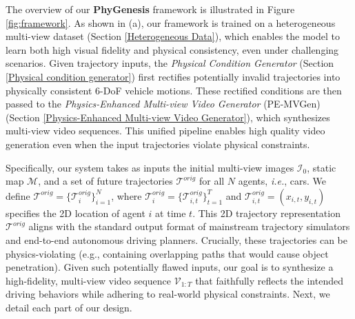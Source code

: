 \documentclass[runningheads]{llncs}
\begin{document}
The overview of our \textbf{PhyGenesis} framework is illustrated in Figure \ref{fig:framework}. As shown in (a), our framework is trained on a heterogeneous multi-view dataset (Section \ref{Heterogeneous Data}), which enables the model to learn both high visual fidelity and physical consistency, even under challenging scenarios.
Given trajectory inputs, the \textit{Physical Condition Generator} (Section \ref{Physical condition generator}) first rectifies potentially invalid trajectories into physically consistent 6-DoF vehicle motions.
These rectified conditions are then passed to the \textit{Physics-Enhanced Multi-view Video Generator} (PE-MVGen) (Section \ref{Physics-Enhanced Multi-view Video Generator}), which synthesizes  multi-view video sequences.
This unified pipeline enables high quality video generation even when the input trajectories violate physical constraints.

Specifically, our system takes as inputs the initial multi-view images $\mathcal{I}_0$, static map $\mathcal{M}$, and a set of future trajectories $\mathcal{T}^{orig}$ for all $N$ agents, \textit{i.e.}, cars. We define $\mathcal{T}^{orig}=\{\mathcal{T}^{orig}_i\}_{i=1}^{N}$, where $\mathcal{T}^{orig}_i=\{\mathcal{T}^{orig}_{i,t}\}_{t=1}^{T}$ and $\mathcal{T}^{orig}_{i,t}=(x_{i,t},y_{i,t})$ specifies the 2D location of agent $i$ at time $t$. This 2D trajectory representation $\mathcal{T}^{orig}$ aligns with the standard output format of mainstream trajectory simulators and end-to-end autonomous driving planners. Crucially, these trajectories can be physics-violating (e.g., containing overlapping paths that would cause object penetration). Given such potentially flawed inputs, our goal is to synthesize a high-fidelity, multi-view video sequence $\mathcal{V}_{1:T}$ that faithfully reflects the intended driving behaviors while adhering to real-world physical constraints. Next, we detail each part of our design.
\end{document}

